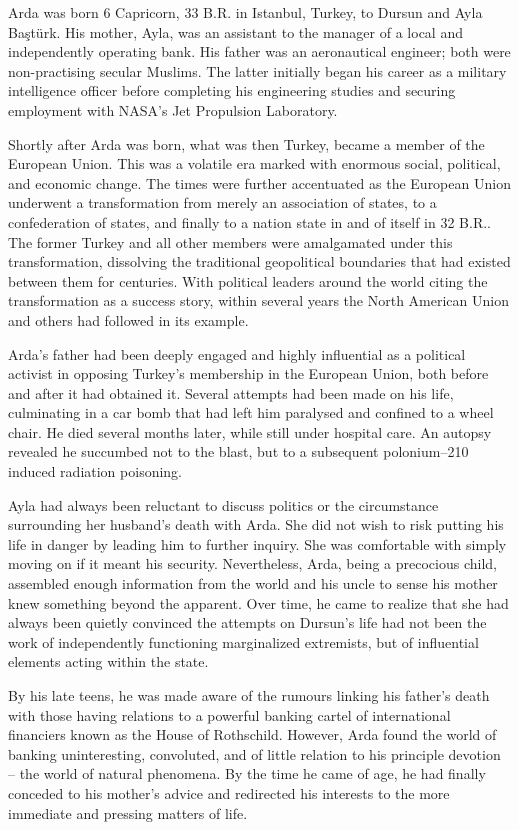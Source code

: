 \index{}Arda was born 6 Capricorn, 33 B.R. in Istanbul, Turkey, to Dursun and Ayla Baştürk. His mother, Ayla, was an assistant to the manager of a local and independently operating bank. His father was an aeronautical engineer; both were non-practising secular Muslims. The latter initially began his career as a military intelligence officer before completing his engineering studies and securing employment with NASA's Jet Propulsion Laboratory.

Shortly after Arda was born, what was then Turkey, became a member of the European Union. This was a volatile era marked with enormous social, political, and economic change. The times were further accentuated as the European Union underwent a transformation from merely an association of states, to a confederation of states, and finally to a nation state in and of itself in 32 B.R.. The former Turkey and all other members were amalgamated under this transformation, dissolving the traditional geopolitical boundaries that had existed between them for centuries. With political leaders around the world citing the transformation as a success story, within several years the North American Union and others had followed in its example.

Arda's father had been deeply engaged and highly influential as a political activist in opposing Turkey's membership in the European Union, both before and after it had obtained it. Several attempts had been made on his life, culminating in a car bomb that had left him paralysed and confined to a wheel chair. He died several months later, while still under hospital care. An autopsy revealed he succumbed not to the blast, but to a subsequent polonium--210 induced radiation poisoning.

Ayla had always been reluctant to discuss politics or the circumstance surrounding her husband's death with Arda. She did not wish to risk putting his life in danger by leading him to further inquiry. She was comfortable with simply moving on if it meant his security. Nevertheless, Arda, being a precocious child, assembled enough information from the world and his uncle to sense his mother knew something beyond the apparent. Over time, he came to realize that she had always been quietly convinced the attempts on Dursun's life had not been the work of independently functioning marginalized extremists, but of influential elements acting within the state.

By his late teens, he was made aware of the rumours linking his father's death with those having relations to a powerful banking cartel of international financiers known as the House of Rothschild. However, Arda found the world of banking uninteresting, convoluted, and of little relation to his principle devotion -- the world of natural phenomena. By the time he came of age, he had finally conceded to his mother's advice and redirected his interests to the more immediate and pressing matters of life.

